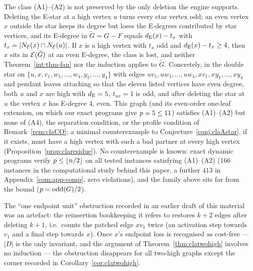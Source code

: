 \begin{remark}\label{rem:clagap}
The class {\rm(A1)--(A2)} is not preserved by the only deletion the engine
supports. Deleting the E-star at a high vertex $u$ turns every star vertex
odd; an even vertex $x$ outside the star keeps its degree but loses the
E-degrees contributed by star vertices, and its E-degree in $\tilde G=G-F$
equals $d_{\mathrm{E}}(x)-t_x$ with $t_x=|N_{\mathcal{E}}(x)\cap N_{\mathcal{E}}(u)|$. If $x$ is a
high vertex with $t_x$ odd and $d_{\mathrm{E}}(x)-t_x\ge 4$, then $x$ sits in
$\mathcal{E}(\tilde G)$ at an even E-degree, the class is lost, and neither
Theorem~\ref{int:thm-fan} nor the induction applies to $\tilde G$. Concretely,
in the double star on
$\{u,x,v_1,w_1,\dots,w_4,y_1,\dots,y_4\}$ with edges
$uv_1,uw_1,\dots,uw_4,xv_1,xy_1,\dots,xy_4$ and pendant leaves attaching
so that the eleven listed vertices have even degree, both $u$ and $x$ are
high with $d_{\mathrm{E}}=5$, $t_{ux}=1$ is odd, and after deleting the star at $u$
the vertex $x$ has E-degree $4$, even. This graph (and its even-order
one-leaf extension, on which our exact programs give $p=5\le 11$)
satisfies {\rm(A1)--(A2)} but none of {\rm(A4)}, the separation condition,
or the profile condition of Remark~\ref{rem:claCO}; a minimal
counterexample to Conjecture~\ref{conj:claAstar}, if it exists, must have
a high vertex with such a bad partner at {\rm every} high vertex
(Proposition~\ref{prop:claresidue}). No counterexample is known: exact
dynamic programs verify $p\le\left\lfloor n/2 \right\rfloor$ on all tested instances
satisfying {\rm(A1)--(A2)} ($166$ instances in the computational study
behind this paper, a further $413$ in Appendix~\ref{com:app-comp}, zero
violations), and the family above sits far from the bound
($p=\mathrm{odd}(G)/2$).

The ``one endpoint unit'' obstruction recorded in an earlier draft of this
material was an artefact: the reinsertion bookkeeping it refers to
restores $k+2$ edges after deleting $k+1$, i.e.\ counts the patched edge
$xv_1$ twice (an activation step towards $v_1$ and a final step towards
$x$). Once $x$'s endpoint loss is recognised as cost-free --- $|D|$ is the
only invariant, and the argument of Theorem~\ref{thm:clatwohigh} involves
no induction --- the obstruction disappears for all two-high graphs except
the corner recorded in Corollary~\ref{cor:clatwohigh}.


\end{remark}
